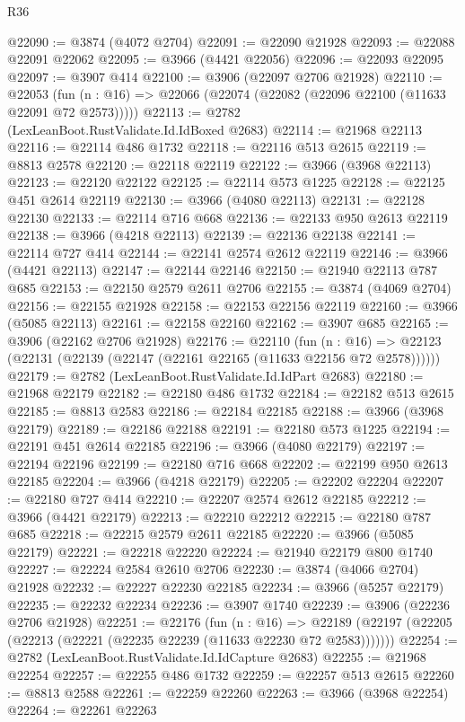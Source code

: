 \begin{lexlean}{R36}
\begin{coremodule}
@22090 := @3874 (@4072 @2704)
@22091 := @22090 @21928
@22093 := @22088 @22091 @22062
@22095 := @3966 (@4421 @22056)
@22096 := @22093 @22095
@22097 := @3907 @414
@22100 := @3906 (@22097 @2706 @21928)
@22110 := @22053
    (fun (n : @16) => @22066 (@22074 (@22082 (@22096 @22100 (@11633 @22091 @72 @2573)))))
@22113 := @2782 (LexLeanBoot.RustValidate.Id.IdBoxed @2683)
@22114 := @21968 @22113
@22116 := @22114 @486 @1732
@22118 := @22116 @513 @2615
@22119 := @8813 @2578
@22120 := @22118 @22119
@22122 := @3966 (@3968 @22113)
@22123 := @22120 @22122
@22125 := @22114 @573 @1225
@22128 := @22125 @451 @2614 @22119
@22130 := @3966 (@4080 @22113)
@22131 := @22128 @22130
@22133 := @22114 @716 @668
@22136 := @22133 @950 @2613 @22119
@22138 := @3966 (@4218 @22113)
@22139 := @22136 @22138
@22141 := @22114 @727 @414
@22144 := @22141 @2574 @2612 @22119
@22146 := @3966 (@4421 @22113)
@22147 := @22144 @22146
@22150 := @21940 @22113 @787 @685
@22153 := @22150 @2579 @2611 @2706
@22155 := @3874 (@4069 @2704)
@22156 := @22155 @21928
@22158 := @22153 @22156 @22119
@22160 := @3966 (@5085 @22113)
@22161 := @22158 @22160
@22162 := @3907 @685
@22165 := @3906 (@22162 @2706 @21928)
@22176 := @22110
    (fun (n : @16) => @22123 (@22131 (@22139 (@22147 (@22161 @22165 (@11633 @22156 @72 @2578))))))
@22179 := @2782 (LexLeanBoot.RustValidate.Id.IdPart @2683)
@22180 := @21968 @22179
@22182 := @22180 @486 @1732
@22184 := @22182 @513 @2615
@22185 := @8813 @2583
@22186 := @22184 @22185
@22188 := @3966 (@3968 @22179)
@22189 := @22186 @22188
@22191 := @22180 @573 @1225
@22194 := @22191 @451 @2614 @22185
@22196 := @3966 (@4080 @22179)
@22197 := @22194 @22196
@22199 := @22180 @716 @668
@22202 := @22199 @950 @2613 @22185
@22204 := @3966 (@4218 @22179)
@22205 := @22202 @22204
@22207 := @22180 @727 @414
@22210 := @22207 @2574 @2612 @22185
@22212 := @3966 (@4421 @22179)
@22213 := @22210 @22212
@22215 := @22180 @787 @685
@22218 := @22215 @2579 @2611 @22185
@22220 := @3966 (@5085 @22179)
@22221 := @22218 @22220
@22224 := @21940 @22179 @800 @1740
@22227 := @22224 @2584 @2610 @2706
@22230 := @3874 (@4066 @2704) @21928
@22232 := @22227 @22230 @22185
@22234 := @3966 (@5257 @22179)
@22235 := @22232 @22234
@22236 := @3907 @1740
@22239 := @3906 (@22236 @2706 @21928)
@22251 := @22176
    (fun (n : @16) =>
    @22189 (@22197 (@22205 (@22213 (@22221 (@22235 @22239 (@11633 @22230 @72 @2583)))))))
@22254 := @2782 (LexLeanBoot.RustValidate.Id.IdCapture @2683)
@22255 := @21968 @22254
@22257 := @22255 @486 @1732
@22259 := @22257 @513 @2615
@22260 := @8813 @2588
@22261 := @22259 @22260
@22263 := @3966 (@3968 @22254)
@22264 := @22261 @22263

\end{coremodule}
\end{lexlean}
